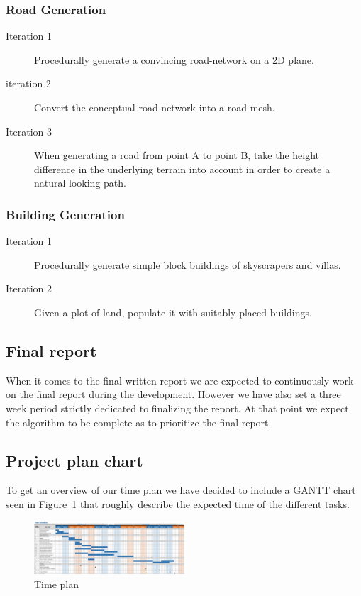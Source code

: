 \subsubsection{Road Generation}
\begin{description}
  \item[Iteration 1] Procedurally generate a convincing road-network on a 2D plane.
  \item[iteration 2] Convert the conceptual road-network into a road mesh.
  \item[Iteration 3] When generating a road from point A to point B, take the height difference in the underlying terrain into account in order to create a natural looking path.
\end{description}

\subsubsection{Building Generation}
\begin{description}
  \item[Iteration 1] Procedurally generate simple block buildings of skyscrapers and villas.
  \item[Iteration 2] Given a plot of land, populate it with suitably placed buildings.
\end{description}


\subsection{Final report}
When it comes to the final written report we are expected to continuously work on the final report during the development.
However we have also set a three week period strictly dedicated to finalizing the report.
At that point we expect the algorithm to be complete as to prioritize the final report.

\subsection{Project plan chart}
To get an overview of our time plan we have decided to include a GANTT chart seen in Figure~\ref{fig:time-plan} that roughly describe the expected time of the different tasks.

\newpage
\begin{figure}[H]
  \centering
  \vspace*{-1.0cm}
  \includegraphics[angle=90, width=0.5\textwidth]{figure/time-plan.png}
  \caption{Time plan}
  \label{fig:time-plan}
\end{figure}



